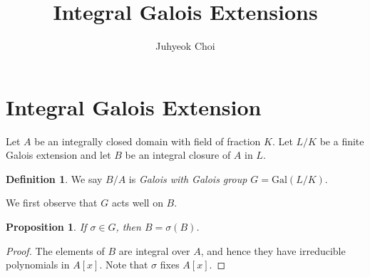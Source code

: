 \documentclass[12pt]{article}
\theoremstyle{plain}
\newtheorem{proposition}[theorem]{Proposition}
\theoremstyle{remark}
\theoremstyle{definition}
\newtheorem{definition}[theorem]{Definition}
\begin{document}
\title{Integral Galois Extensions}
\author{Juhyeok Choi}
\date{}

\maketitle

\section{Integral Galois Extension}

Let $A$ be an integrally closed domain with field of fraction $K$. Let $L/K$ be a finite Galois extension and let $B$ be an integral closure of $A$ in $L$.

\begin{figure}[H]
    \centering
\end{figure}

\begin{definition}
    We say $B/A$ is \emph{Galois with Galois group $G=\mathrm{Gal}(L/K)$}.
\end{definition}

We first observe that $G$ acts well on $B$.

\begin{proposition}
    If $\sigma\in G$, then $B=\sigma(B)$.
\end{proposition}
\begin{proof}
    The elements of $B$ are integral over $A$, and hence they have irreducible polynomials in $A[x]$. Note that $\sigma$ fixes $A[x]$.
\end{proof}
\end{document}

